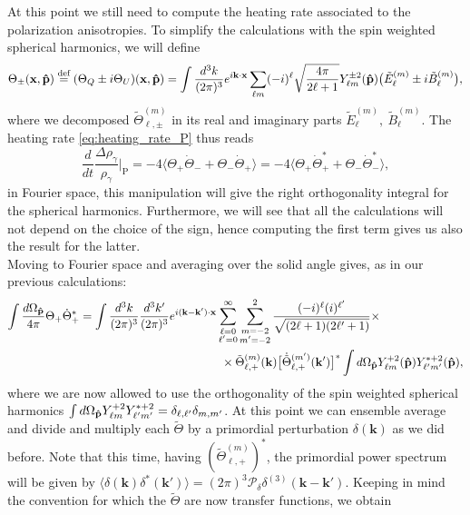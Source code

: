 At this point we still need to compute the heating rate associated to the polarization anisotropies. To simplify the calculations with the spin weighted spherical harmonics, we will define $$\Theta_{\pm}(\mathbf{x,\mathbf{\hat{p}}})\stackrel{\text{def}}{=}(\Theta_Q\pm i\Theta_U)(\mathbf{x,\mathbf{\hat{p}}})=\int\frac{d^3k}{(2\pi)^3}e^{i\mathbf{k}\cdot\mathbf{x}}\sum_{\ell m} (-i)^{\ell}\sqrt{\frac{4\pi}{2\ell+1}}Y^{\pm2}_{\ell m}(\mathbf{\hat{p}})\big(\tilde E_{\ell}^{(m)}\pm i\tilde B_\ell^{(m)}\big),$$
where we decomposed  $\tilde\Theta_{\ell,\pm}^{(m)}$ in its real and imaginary parts $\tilde E_{\ell}^{(m)},\ \tilde B_\ell^{(m)}
$. The heating rate \eqref{eq:heating_rate_P} thus reads 
$$\frac{d}{dt}\frac{\Delta \rho_\gamma}{\rho_\gamma}\bigg|_\text{P}=-4\langle\Theta_+\dot\Theta_-+\Theta_-\dot\Theta_+\rangle=-4\langle\Theta_+\dot\Theta_+^*+\Theta_-\dot\Theta_-^*\rangle,$$ in Fourier space, this manipulation will give the right orthogonality integral for the spherical harmonics. Furthermore, we will see that all the calculations will not depend on the choice of the sign, hence computing the first term gives us also the result for the latter.\\
Moving to Fourier space and averaging over the solid angle gives, as in our previous calculations:
\begin{align*}
    \int\frac{d\Omega_{\mathbf{\hat{p}}}}{4\pi}\Theta_+\dot \Theta_+^*&=\int\frac{d^3k}{(2\pi)^3}\frac{d^3k'}{(2\pi)^3}e^{i(\mathbf{k}-\mathbf{k}')\cdot\mathbf{x}}\sum_{\substack{\ell=0\\\ell'=0}}^{\infty}\sum_{\substack{m=-2\\m'=-2}}^{2}\frac{(-i)^{\ell}(i)^{\ell'}}{\sqrt{(2\ell+1)(2\ell'+1)}}\times\\&\qquad\qquad\qquad\qquad\qquad\qquad\times\tilde\Theta_{\ell,+}^{(m)}(\mathbf{k})\big[\dot{\tilde\Theta}_{\ell,+}^{(m')}(\mathbf{k}')\big]^*\int d\Omega_{\mathbf{\hat{p}}} Y^{+2}_{\ell m}(\mathbf{\hat{p}})Y^{*+2}_{\ell' m'}(\mathbf{\hat{p}}),
\end{align*}
where we are now allowed to use the orthogonality of the spin weighted spherical harmonics $\int d\Omega_{\mathbf{\hat{p}}} Y^{+2}_{\ell m}Y^{*+2}_{\ell' m'}=\delta_{\ell, \ell'}\delta_{m,m'}$. At this point we can ensemble average and divide and multiply each $\tilde\Theta$ by a primordial perturbation $\delta(\mathbf{k})$ as we did before. Note that this time, having $(\tilde\Theta_{\ell,+}^{(m)})^*$, the primordial power spectrum will be given by $\langle\delta(\mathbf{k})\delta^*(\mathbf{k'})\rangle=(2\pi)^3\mathcal{P}_\delta\delta^{(3)}(\mathbf{k}-\mathbf{k}')$. Keeping in mind the convention for which the $\tilde\Theta$ are now transfer functions, we obtain
